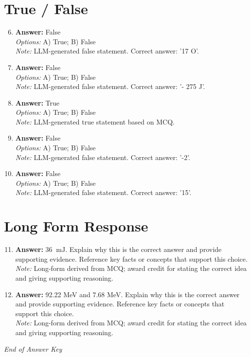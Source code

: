 \documentclass[12pt]{article}
\begin{document}
\section*{True / False}
\begin{enumerate}[label=\arabic*.]
\setcounter{enumi}{5}
\item \textbf{Answer:} False
\\ \textit{Options:} A) True; B) False
\\ \textit{Note:} LLM-generated false statement. Correct answer: '17 O'.
\item \textbf{Answer:} False
\\ \textit{Options:} A) True; B) False
\\ \textit{Note:} LLM-generated false statement. Correct answer: '- 275 J'.
\item \textbf{Answer:} True
\\ \textit{Options:} A) True; B) False
\\ \textit{Note:} LLM-generated true statement based on MCQ.
\item \textbf{Answer:} False
\\ \textit{Options:} A) True; B) False
\\ \textit{Note:} LLM-generated false statement. Correct answer: '-2'.
\item \textbf{Answer:} False
\\ \textit{Options:} A) True; B) False
\\ \textit{Note:} LLM-generated false statement. Correct answer: '15'.
\end{enumerate}

\section*{Long Form Response}
\begin{enumerate}[label=\arabic*.]
\setcounter{enumi}{10}
\item \textbf{Answer:} 36 $\mathrm{~mJ}$. Explain why this is the correct answer and provide supporting evidence. Reference key facts or concepts that support this choice.
\\ \textit{Note:} Long-form derived from MCQ; award credit for stating the correct idea and giving supporting reasoning.
\item \textbf{Answer:} 92.22 MeV and 7.68 MeV. Explain why this is the correct answer and provide supporting evidence. Reference key facts or concepts that support this choice.
\\ \textit{Note:} Long-form derived from MCQ; award credit for stating the correct idea and giving supporting reasoning.
\end{enumerate}

\vfill
\noindent\textit{End of Answer Key}
\end{document}
